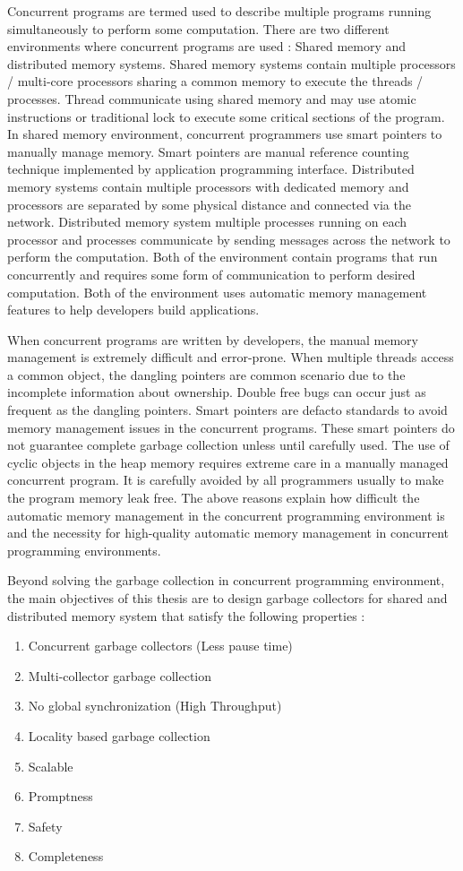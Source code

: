 Concurrent programs are termed used to describe multiple programs running simultaneously to perform some computation. There are two different environments where concurrent programs are used : Shared memory and distributed memory systems. Shared memory systems contain multiple processors / multi-core processors sharing a common memory to execute the threads / processes. Thread communicate using shared memory and may use atomic instructions or traditional lock to execute some critical sections of the program. 
In shared memory environment, concurrent programmers use smart pointers to manually manage memory. Smart pointers are manual reference counting technique implemented by application programming interface. Distributed memory systems contain multiple processors with dedicated memory and processors are separated by some physical distance and connected via the network. Distributed memory system multiple processes running on each processor and processes communicate by sending messages across the network to perform the computation. Both of the environment contain programs that run concurrently and requires some form of communication to perform desired computation. Both of the environment uses automatic memory management features to help developers build applications. 

When concurrent programs are written by developers, the manual memory management is extremely difficult and error-prone. When multiple threads access a common object, the dangling pointers are common scenario due to the incomplete information about ownership. Double free bugs can occur just as frequent as the dangling pointers. Smart pointers are defacto standards to avoid memory management issues in the concurrent programs. These smart pointers do not guarantee complete garbage collection unless until carefully used. The use of cyclic objects in the heap memory requires extreme care in a manually managed concurrent program. It is carefully avoided by all programmers usually to make the program memory leak free. The above reasons explain how difficult the automatic memory management in the concurrent programming environment is and the necessity for high-quality automatic memory management in concurrent programming environments. 

Beyond solving the garbage collection in concurrent programming environment, the main objectives of this thesis are to design garbage collectors for shared and distributed memory system that satisfy the following properties :
\begin{enumerate}
	\item Concurrent garbage collectors (Less pause time)
	\item Multi-collector garbage collection
	\item No global synchronization (High Throughput)
	\item Locality based garbage collection
	\item Scalable
	\item Promptness
	\item Safety
	\item Completeness
\end{enumerate}

